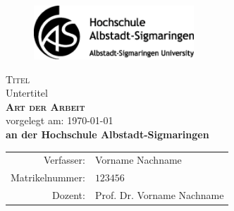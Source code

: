 	\begin{titlepage}
		\renewcommand{\baselinestretch}{1}
		\begin{figure}[htbp]
			\centering
			\includegraphics[width=6cm]{./abbildungen/Logo}
			\label{fig:Logo}
		\end{figure}
		\vspace*{2cm}
		\begin{center}
			\huge \textsf{\textsc{Titel} \\
				{\Large Untertitel}} \\
			\vspace{2cm}
			\LARGE\textbf{\textsc{Art der Arbeit}}\\
			\vspace{0.5cm}
			\normalsize
			vorgelegt am: \today \\
			\vspace{1cm}
			\large \textbf{an der Hochschule Albstadt-Sigmaringen}\\
			\vspace*{\fill}
		\end{center}
		\normalsize{
			\begin{tabular}{rl}
				Verfasser: & {Vorname Nachname} \\
				Matrikelnummer: & $ 123456 $\\
				Dozent: & {Prof. Dr. Vorname Nachname} \\
			\end{tabular}\\
		}
	\end{titlepage}

